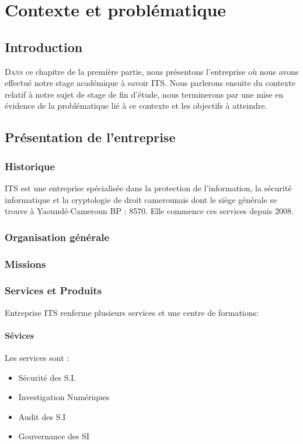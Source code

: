 \chapter{Contexte et problématique}

	\section*{Introduction}
	\lettrine{D}{ans} ce chapitre de la première partie, nous présentons l'entreprise où nous avons effectué notre stage académique à savoir ITS. Nous parlerons ensuite du contexte relatif à notre sujet de stage de fin d'étude, nous terminerons par une mise en évidence de la problématique lié à ce contexte  et les objectifs à atteindre. 
	

	\section{Présentation de l'entreprise}
		\subsection{Historique}
			ITS  est une entreprise spécialisée dans la protection de l’information, la
sécurité informatique et la cryptologie de droit camerounais dont le siège générale se trouve à Yaoundé-Cameroun BP : 8570. Elle commence ces services depuis 2008.
		
		\subsection{Organisation générale}
		
		
		\subsection{Missions}
		
		\subsection{Services et Produits}
			Entreprise ITS renferme plusieurs services et une centre de formations:
				\subsubsection{Sévices}
					Les services sont :
						\begin{itemize}
							  \item Sécurité des S.I.
       						  \item Investigation Numériques
       						  \item Audit des S.I
     						  \item Gouvernance des SI
						\end{itemize}
